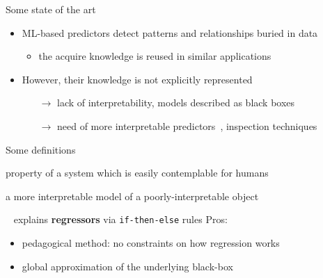 \documentclass[presentation]{beamer}
\begin{document}
\begin{frame}[allowframebreaks]{Some state of the art}
	
    \begin{itemize}
    	\item ML-based predictors detect patterns and relationships buried in data
    	\begin{itemize}
    		\item the acquire knowledge is reused in similar applications
    	\end{itemize}
    
    	\bigskip
    
    	\item However, their knowledge is not explicitly represented
    	\begin{itemize}
    		\item[$\rightarrow$] lack of interpretability, models described as black boxes~
    		\item[$\rightarrow$] need of more interpretable predictors~, inspection techniques~    		
    	\end{itemize}
    \end{itemize}

	\framebreak %

	\begin{block}{Some definitions~}
		\begin{description}\small
			\item[interpretability] property of a system which is easily contemplable for humans  
			\item[explanation] a more interpretable model of a poorly-interpretable object
		\end{description}
	\end{block}

	\framebreak

	\begin{block}{\iter~ explains \textbf{regressors} via \texttt{if-then-else} rules}
		Pros:
		\begin{itemize}
			\item pedagogical method: no constraints on how regression works
			\item global approximation of the underlying black-box 
		\end{itemize}


\end{block}
\end{frame}
\end{document}
